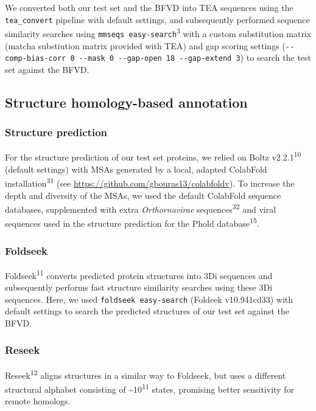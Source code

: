 \documentclass[
  sn-nature,
]{sn-jnl}
\begin{document}
We converted both our test set and the BFVD into TEA sequences using the
\texttt{tea\_convert} pipeline with default settings, and subsequently
performed sequence similarity searches using
\texttt{mmseqs\ easy-search}\textsuperscript{3} with a custom
substitution matrix (matcha substiution matrix provided with TEA) and
gap scoring settings
(\texttt{-\/-comp-bias-corr\ 0\ -\/-mask\ 0\ -\/-gap-open\ 18\ -\/-gap-extend\ 3})
to search the test set against the BFVD.

\subsection{Structure homology-based
annotation}\label{structure-homology-based-annotation}

\subsubsection{Structure prediction}\label{structure-prediction}

For the structure prediction of our test set proteins, we relied on
Boltz v2.2.1\textsuperscript{10} (default settings) with MSAs generated
by a local, adapted ColabFold installation\textsuperscript{31} (see
\url{https://github.com/gbouras13/colabfoldv}). To increase the depth
and diversity of the MSAs, we used the default ColabFold sequence
databases, supplemented with extra \emph{Orthornavirae}
sequences\textsuperscript{32} and viral sequences used in the structure
prediction for the Phold database\textsuperscript{15}.

\subsubsection{Foldseek}\label{foldseek}

Foldseek\textsuperscript{11} converts predicted protein structures into
3Di sequences and subsequently performs fast structure similarity
searches using these 3Di sequences. Here, we used
\texttt{foldseek\ easy-search} (Foldeek v10.941cd33) with default
settings to search the predicted structures of our test set against the
BFVD.

\subsubsection{Reseek}\label{reseek}

Reseek\textsuperscript{12} aligns structures in a similar way to
Foldseek, but uses a different structural alphabet consisting of
\textasciitilde10\textsuperscript{11} states, promising better
sensitivity for remote homologs.
\end{document}
